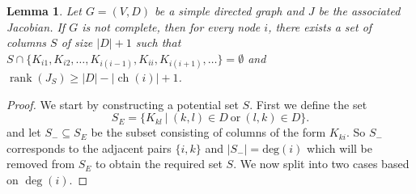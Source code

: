 \documentclass[12pt,reqno]{amsart}
\theoremstyle{plain}
\newtheorem{lemma}[theorem]{Lemma}
\theoremstyle{definition}
\DeclareMathOperator{\ch}{ch}
\DeclareMathOperator{\rank}{rank}
\begin{document}
\begin{lemma}\label{ranklowerbd}
Let $G=(V,D)$ be a simple directed graph and $J$ be the associated Jacobian. If $G$ is not complete, then for every node $i$, there exists a set of columns $S$ of size $|D|+1$ such that 
$S \cap \{K_{i1},K_{i2},\ldots,K_{i(i-1)},K_{ii},K_{i(i+1)},\ldots \}=\emptyset$ and $\rank(J_S) \geq |D|-|\ch(i)|+1$.
\end{lemma}
\begin{proof}
We start by constructing a potential set $S$. First we define the set
\[
S_E = \{K_{kl} ~|~ (k, l) \in D ~\mathrm{or}~ (l, k) \in D\}.
\]
and let $S_- \subseteq S_E$ be the subset consisting of columns of the form $K_{ki}$. So $S_-$ corresponds to the adjacent pairs $\{i,k\}$ and $|S_-|= \text{deg}(i)$ which will be removed from $S_E$ to obtain the required set $S$. We now split into two cases based on $\deg(i)$.


\end{proof}
\end{document}
